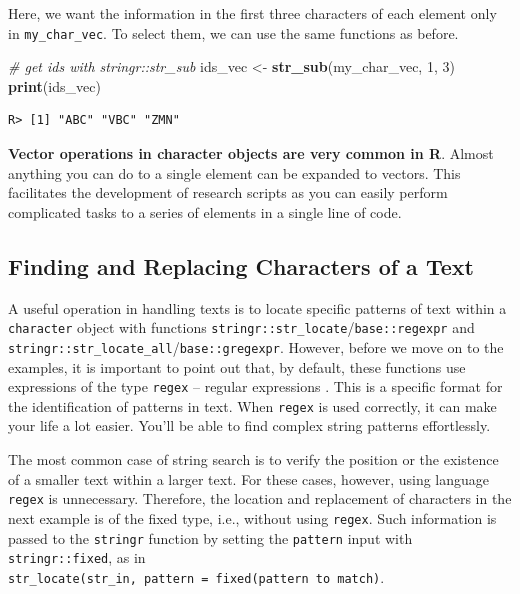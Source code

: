 \documentclass[
  12pt,
]{book}
\newenvironment{Shaded}{\begin{snugshade}}{\end{snugshade}}
\newcommand{\CommentTok}[1]{\textcolor[rgb]{0.37,0.37,0.37}{\textit{#1}}}
\newcommand{\DecValTok}[1]{\textcolor[rgb]{0.06,0.06,0.06}{#1}}
\newcommand{\KeywordTok}[1]{\textcolor[rgb]{0.27,0.27,0.27}{\textbf{#1}}}
\newcommand{\NormalTok}[1]{#1}
\newcommand{\StringTok}[1]{\textcolor[rgb]{0.5,0.5,0.5}{#1}}
\newenvironment{rmdimportant}
{\begin{importantblock}
		
	} {\end{importantblock}}
\begin{document}
Here, we want the information in the first three characters of each element only in \texttt{my\_char\_vec}. To select them, we can use the same functions as before.

\begin{Shaded}
\begin{Highlighting}[]
\CommentTok{# get ids with stringr::str_sub}
\NormalTok{ids_vec <-}\StringTok{ }\KeywordTok{str_sub}\NormalTok{(my_char_vec, }\DecValTok{1}\NormalTok{, }\DecValTok{3}\NormalTok{)}
\KeywordTok{print}\NormalTok{(ids_vec)}
\end{Highlighting}
\end{Shaded}

\begin{verbatim}
R> [1] "ABC" "VBC" "ZMN"
\end{verbatim}

\begin{rmdimportant}
\textbf{Vector operations in character objects are very common in R}.
Almost anything you can do to a single element can be expanded to
vectors. This facilitates the development of research scripts as you can
easily perform complicated tasks to a series of elements in a single
line of code.
\end{rmdimportant}

\hypertarget{finding-and-replacing-characters-of-a-text}{%
\subsection{Finding and Replacing Characters of a Text}\label{finding-and-replacing-characters-of-a-text}}

A useful operation in handling texts is to locate specific patterns of text within a \texttt{character} object with functions \texttt{stringr::str\_locate}/\texttt{base::regexpr} and \texttt{stringr::str\_locate\_all}/\texttt{base::gregexpr}. However, before we move on to the examples, it is important to point out that, by default, these functions use expressions of the type \texttt{regex} -- regular expressions \citep{thompson1968programming}. This is a specific format for the identification of patterns in text. When \texttt{regex} is used correctly, it can make your life a lot easier. You'll be able to find complex string patterns effortlessly.

The most common case of string search is to verify the position or the existence of a smaller text within a larger text. For these cases, however, using language \texttt{regex} is unnecessary. Therefore, the location and replacement of characters in the next example is of the fixed type, i.e., without using \texttt{regex}. Such information is passed to the \texttt{stringr} function by setting the \texttt{pattern} input with \texttt{stringr::fixed}, as in \texttt{str\_locate(str\_in,\ pattern\ =\ fixed(\textquotesingle{}pattern\ to\ match\textquotesingle{})}.      
\end{document}
